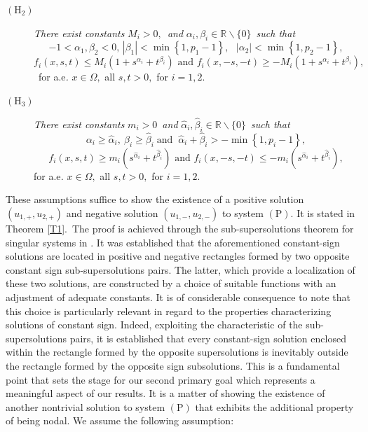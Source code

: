 \documentclass[11pt]{amsart}
\theoremstyle{definition}
\theoremstyle{remark}
\numberwithin{equation}{section}
\begin{document}
\begin{description}
\item[$(\mathrm{H}_{2})$] \textit{There exist constants }$M_{i}>0,$\textit{\
and }$\alpha _{i},\beta _{i}\in 
\mathbb{R}
\backslash \{0\}$\textit{\ such that} 
\begin{equation*}
-1<\alpha _{1},\beta _{2}<0\text{, \ }|\beta _{1}|<\min \left\{
1,p_{1}-1\right\} ,\text{ \ \ }|\alpha _{2}|<\min \left\{ 1,p_{2}-1\right\} ,
\end{equation*}
\begin{equation*}
f_{i}(x,s,t)\leq M_{i}(1+s^{\alpha _{i}}+t^{\beta _{i}})\text{ \ and \ }
f_{i}(x,-s,-t)\geq -M_{i}(1+s^{\alpha _{i}}+t^{\beta _{i}}),
\end{equation*}
\ for a.e\textit{. }$x\in \Omega ,$ all $s,t>0,$ for $i=1,2.$

\item[$(\mathrm{H}_{3})$] \textit{There exist constants }$m_{i}>0$\textit{\
and }$\hat{\alpha}_{i},\hat{\beta}_{i}\in 
\mathbb{R}
\backslash \{0\}$\textit{\ such that} 
\begin{equation*}
\alpha _{i}\geq \hat{\alpha}_{i},\ \beta _{i}\geq \hat{\beta}_{i}\;\text{and 
}\ \hat{\alpha}_{i}+\hat{\beta}_{i}>-\min \left\{ 1,p_{i}-1\right\} ,
\end{equation*}
\begin{equation*}
f_{i}(x,s,t)\geq m_{i}(s^{\hat{\alpha}_{i}}+t^{\hat{\beta}_{i}})\text{ \ and
\ }f_{i}(x,-s,-t)\leq -m_{i}(s^{\hat{\alpha}_{i}}+t^{\hat{\beta}_{i}}),
\end{equation*}
for a.e\textit{. }$x\in \Omega ,$ all $s,t>0,$ for $i=1,2.$
\end{description}

These assumptions suffice to show the existence of a positive solution $%
(u_{1,+},u_{2,+})$ and negative solution $(u_{1,-},u_{2,-})$ to system $(%
\mathrm{P})$. It is stated in Theorem \ref{T1}.\ The proof is achieved
through the sub-supersolutions theorem for singular systems in \cite[Theorem
2]{KM}. It was established that the aforementioned constant-sign solutions
are located in positive and negative rectangles formed by two opposite
constant sign sub-supersolutions pairs. The latter, which provide a
localization of these two solutions, are constructed by a choice of suitable
functions with an adjustment of adequate constants. It is of considerable
consequence to note that this choice is particularly relevant in regard to
the properties characterizing solutions of constant sign. Indeed, exploiting
the characteristic of the sub-supersolutions pairs, it is established that
every constant-sign solution enclosed within the rectangle formed by the
opposite supersolutions is inevitably outside the rectangle formed by the
opposite sign subsolutions. This is a fundamental point that sets the stage
for our second primary goal which represents a meaningful aspect of our
results. It is a matter of showing the existence of another nontrivial
solution to system $(\mathrm{P})$ that exhibits the additional property of
being nodal. We assume the following assumption:
\end{document}
